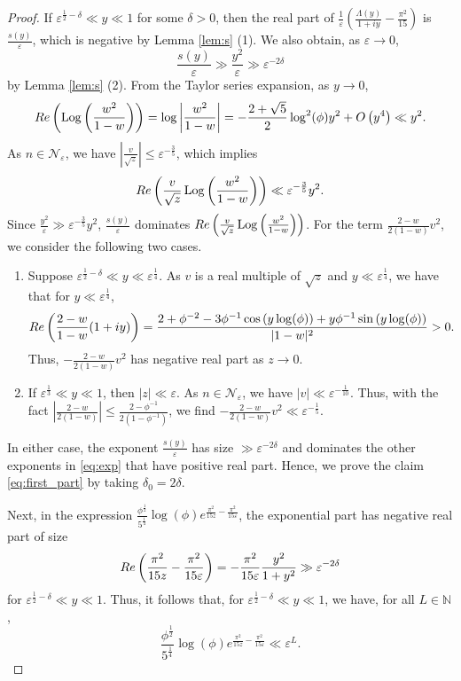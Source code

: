 \documentclass[10pt,a4paper]{amsart}
\def\Log{\operatorname{Log}}
\renewcommand{\Re}{{\rm Re}}
\begin{document}
\begin{proof}
If $\varepsilon^{\frac12-\delta} \ll y \ll 1$ for some $\delta>0$, then %
the real part of $\frac{1}{\varepsilon}\left(\frac{\Lambda(y)}{1+iy}-\frac{\pi^2}{15}\right)$ is $\frac{s(y)}{\varepsilon}$, which is negative by Lemma \ref{lem:s} (1). We also obtain, as $\varepsilon \to 0$, 
\[
	\frac{s(y)}{\varepsilon} \gg \frac{y^2}{\varepsilon} \gg \varepsilon^{-2\delta}
\]
by Lemma \ref{lem:s} (2). 
From the Taylor series expansion, as $y \to 0$, 
\[
	\Re\left( \Log\left(\frac{w^2}{1-w}\right) \right) = \log \left|\frac{w^2}{1-w} \right| = -\frac{2+\sqrt{5}}{2} \log^2(\phi) y^2 + O\left(y^4\right) \ll y^2.
\]
As $n \in \mathcal{N}_{\varepsilon}$, we have $\left|\frac{v}{\sqrt{z}}\right| \leq \varepsilon^{-\frac35}$, which implies
\[
	\Re\left( \frac{v}{\sqrt{z}} \Log\left(\frac{w^2}{1-w}\right) \right) \ll \varepsilon^{-\frac35} y^2.
\]	
Since $\frac{y^2}{\varepsilon} \gg \varepsilon^{-\frac35} y^2$, $\frac{s(y)}{\varepsilon}$ dominates $\Re\left( \frac{v}{\sqrt{z}} \Log\left(\frac{w^2}{1-w}\right) \right)$. For the term $\frac{2-w}{2(1-w)}v^2$, we consider the following two cases. 
\begin{enumerate}
	\item Suppose $\varepsilon^{\frac12-\delta} \ll y \ll \varepsilon^{\frac14}$. As $v$ is a real multiple of $\sqrt{z}$ and $y\ll \varepsilon^{\frac14}$, we have that for $y \ll \varepsilon^{\frac14}$,
	\[
		\Re \left(\frac{2-w}{1-w} (1+iy)\right) = \frac{2+\phi^{-2}-3\phi^{-1}\cos\left(y\log(\phi)\right)+y\phi^{-1}\sin\left(y\log(\phi)\right)}{|1-w|^2} >0.
	\]
	Thus, $-\frac{2-w}{2(1-w)}v^2$ has negative real part as $z\to 0$.
	
	\item If $\varepsilon^{\frac13} \ll y \ll 1$, then $|z|\ll \varepsilon$. As $n \in \mathcal{N}_{\varepsilon}$, we have $|v|\ll \varepsilon^{-\frac1{10}}$. Thus, with the fact $\left|\frac{2-w}{2(1-w)}\right| \leq \frac{2-\phi^{-1}}{2(1-\phi^{-1})}$, we find $-\frac{2-w}{2(1-w)}v^2 \ll  \varepsilon^{-\frac15}$. %
\end{enumerate}
In either case, the exponent $\frac{s(y)}{\varepsilon}$ has size $\gg \varepsilon^{-2\delta}$ and dominates the other exponents in \eqref{eq:exp} that have positive real part. Hence, we prove the claim \eqref{eq:first_part} by taking $\delta_0=2\delta$.

Next, in the expression $\frac{\phi^{\frac12} }{5^{\frac14}}\log(\phi) e^{\frac{\pi^2}{15 z}-\frac{\pi^2}{15\varepsilon}}$, the exponential part has negative real part of size
\[
	\Re\left(\frac{\pi^2}{15 z}-\frac{\pi^2}{15\varepsilon}\right)%
	= - \frac{\pi^2}{15\varepsilon} \frac{y^2}{1+y^2} \gg \varepsilon^{-2\delta}
\]
for $\varepsilon^{\frac12-\delta} \ll y \ll 1$. Thus, it follows that, for $\varepsilon^{\frac12-\delta} \ll y \ll 1$, we have, for all $L \in \mathbb{N}$,
\[
	\frac{\phi^{\frac12} }{5^{\frac14}}\log(\phi) e^{\frac{\pi^2}{15 z}-\frac{\pi^2}{15\varepsilon}} \ll \varepsilon^L.
\]
\end{proof}
\end{document}
